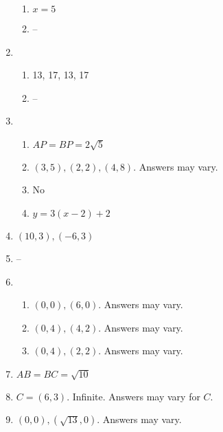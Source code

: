 \documentclass{article}
\begin{document}
\begin{enumerate}
\begin{enumerate}
	\item $x = 5$
	
	\item --
	
	\end{enumerate}
	
\item

	\begin{enumerate}
	
	\item 13, 17, 13, 17
	
	\item --
	
	\end{enumerate}
	
\item

	\begin{enumerate}
	
	\item $AP = BP = 2\sqrt{5}$
	
	\item $(3, 5), (2,2), (4,8).$ Answers may vary.
	
	\item No
	
	\item $y = 3(x-2) + 2$
	
	\end{enumerate}
	
\item $(10,3), (-6, 3)$

\item --

\item

	\begin{enumerate}
	
	\item $(0,0), (6,0).$ Answers may vary.
	
	\item $(0,4), (4,2).$ Answers may vary.
	
	\item $(0,4), (2, 2).$ Answers may vary.
	
	\end{enumerate}
	
\item $AB = BC = \sqrt{10}$

\item $C = (6, 3).$ Infinite. Answers may vary for $C$.

\item $(0,0), (\sqrt{13}, 0)$. Answers may vary.


\end{enumerate}
\end{document}
